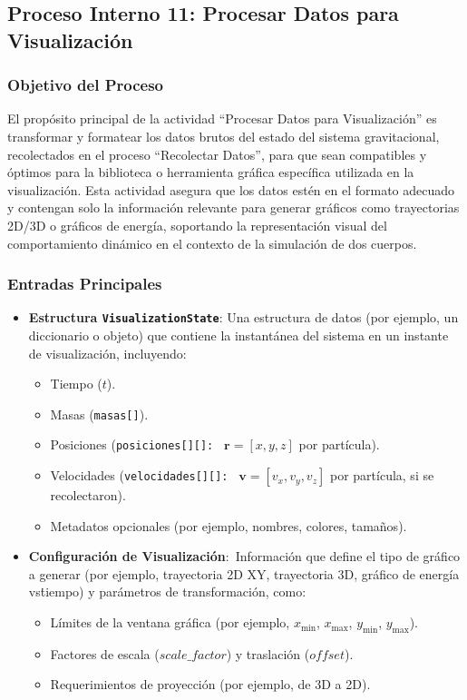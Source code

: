 \subsection[Proceso Interno 11: Procesar Datos]{Proceso Interno 11: Procesar Datos para Visualización}

\subsubsection{Objetivo del Proceso}
El propósito principal de la actividad ``Procesar Datos para Visualización'' es transformar y formatear los datos brutos del estado del sistema gravitacional, recolectados en el proceso ``Recolectar Datos'', para que sean compatibles y óptimos para la biblioteca o herramienta gráfica específica utilizada en la visualización. Esta actividad asegura que los datos estén en el formato adecuado y contengan solo la información relevante para generar gráficos como trayectorias 2D/3D o gráficos de energía, soportando la representación visual del comportamiento dinámico en el contexto de la simulación de dos cuerpos.

\subsubsection{Entradas Principales}
\begin{itemize}
    \item \textbf{Estructura \texttt{VisualizationState}}: Una estructura de datos (por ejemplo, un diccionario o objeto) que contiene la instantánea del sistema en un instante de visualización, incluyendo:
    \begin{itemize}
        \item Tiempo ($t$).
        \item Masas (\texttt{masas[]}).
        \item Posiciones (\texttt{posiciones[][]: } $\mathbf{r} = [x, y, z]$ por partícula).
        \item Velocidades (\texttt{velocidades[][]: } $\mathbf{v} = [v_x, v_y, v_z]$ por partícula, si se recolectaron).
        \item Metadatos opcionales (por ejemplo, nombres, colores, tamaños).
    \end{itemize}
    \item \textbf{Configuración de Visualización}:\ Información que define el tipo de gráfico a generar (por ejemplo, trayectoria 2D XY, trayectoria 3D, gráfico de energía vs\. tiempo) y parámetros de transformación, como:
    \begin{itemize}
        \item Límites de la ventana gráfica (por ejemplo, $x_{\text{min}}$, $x_{\text{max}}$, $y_{\text{min}}$, $y_{\text{max}}$).
        \item Factores de escala ($scale\_factor$) y traslación ($offset$).
        \item Requerimientos de proyección (por ejemplo, de 3D a 2D).
    \end{itemize}
\end{itemize}

